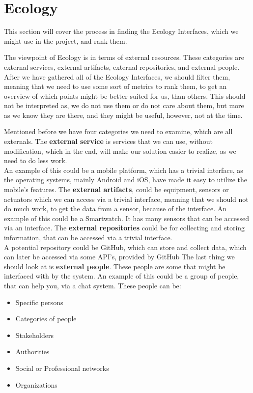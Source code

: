 \section{Ecology}\label{sec:ecology-interface}
This section will cover the process in finding the Ecology Interfaces, which we might use in the project, and rank them.

The viewpoint of Ecology is in terms of external resources.
These categories are external services, external artifacts, external repositories, and external people.
After we have gathered all of the Ecology Interfaces, we should filter them, meaning that we need to use some sort of metrics to rank them, to get an overview of which points might be better suited for us, than others.
This should not be interpreted as, we do not use them or do not care about them, but more as we know they are there, and they might be useful, however, not at the time.

Mentioned before we have four categories we need to examine, which are all externals.
The \textbf{external service} is services that we can use, without modification, which in the end, will make our solution easier to realize, as we need to do less work.\\
An example of this could be a mobile platform, which has a trivial interface, as the operating systems, mainly Android and iOS, have made it easy to utilize the mobile's features.
The \textbf{external artifacts}, could be equipment, sensors or actuators which we can access via a trivial interface, meaning that we should not do much work, to get the data from a sensor, because of the interface.
An example of this could be a Smartwatch.
It has many sensors that can be accessed via an interface.
The \textbf{external repositories} could be for collecting and storing information, that can be accessed via a trivial interface.\\
A potential repository could be GitHub, which can store and collect data, which can later be accessed via some API's, provided by GitHub 
The last thing we should look at is \textbf{external people}.
These people are some that might be interfaced with by the system.
An example of this could be a group of people, that can help you, via a chat system.
These people can be:

\begin{itemize}
    \item Specific persons
    \item Categories of people
    \item Stakeholders
    \item Authorities
    \item Social or Professional networks
    \item Organizations
\end{itemize}

